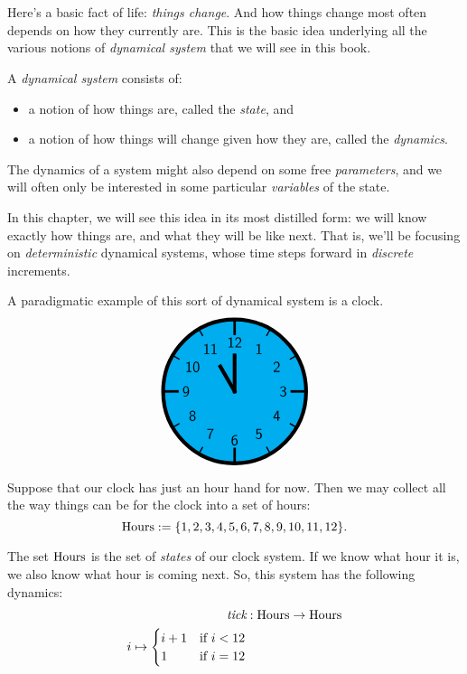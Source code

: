 \documentclass[DynamicalBook]{subfiles}
\begin{document}
%


\setcounter{chapter}{0}%


\chapter{}


Here's a basic fact of life: \emph{things change}. And how things change most
often depends on how they currently are. This is the basic idea underlying all the various notions of \emph{dynamical
  system} that we will see in this book.

\begin{informal}
  A \emph{dynamical system} consists of:
  \begin{itemize}
  \item a notion of how things are, called the \emph{state}, and
  \item a notion of how things will change given how they are, called the \emph{dynamics}.
  \end{itemize}
  The dynamics of a system might also depend on some free \emph{parameters}, and
  we will often only be interested in some particular \emph{variables} of the
  state. 
\end{informal}

In this chapter, we will see this idea in its
most distilled form: we will know exactly how things are, and what they will be
like next. That is, we'll be focusing on \emph{deterministic} dynamical systems,
whose time steps forward in \emph{discrete} increments.

A paradigmatic example of this sort of dynamical system is a clock.
\[
\begin{tikzpicture}[line cap=rect,line width=3pt]
\filldraw [fill=cyan] (0,0) circle [radius=2cm];
\foreach \angle [count=\xi] in {60,30,...,-270}
{
  \draw[line width=1pt] (\angle:1.8cm) -- (\angle:2cm);
  \node[font=\large] at (\angle:1.36cm) {\textsf{\xi}};
}
\foreach \angle in {0,90,180,270}
  \draw[line width=2pt] (\angle:1.6cm) -- (\angle:2cm);
\draw (0,0) -- (120:0.8cm);
\draw (0,0) -- (90:1cm);
\end{tikzpicture}
\]

Suppose that our clock has just an hour hand for now. Then we may collect all
the way things can be for the clock into a set of hours:
$$\mathrm{Hours} := \{1, 2, 3, 4, 5, 6, 7, 8, 9, 10, 11, 12\}.$$

The set $\mathrm{Hours}$ is the set of \emph{states} of our clock system. If we know what hour it is, we also know what hour is coming next. So, this system has the following dynamics:
%
%
\begin{align*}
  \textit{tick} &: \mathrm{Hours} \to \mathrm{Hours} \\
                i \mapsto \begin{cases} i + 1 &\mbox{if $i < 12$}\\ 1 &\mbox{if $i = 12$}  \end{cases}
\end{align*}
\end{document}
